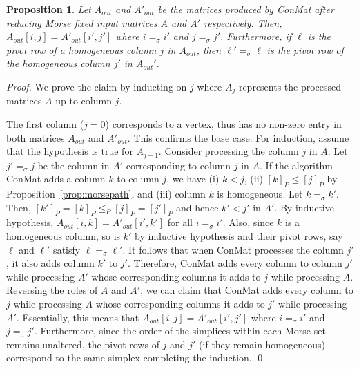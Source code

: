 \documentclass[a4paper,english,cleveref]{article}
\theoremstyle{plain}
\newtheorem{prop}{Proposition}[section]
\newcounter{li}
\newcommand{\tamal}[1]{\textcolor{blue}{#1}}
\newcommand\michal[1]{\textcolor{ForestGreen}{[ML: #1]}}
\begin{document}
\begin{prop}
Let $A_{out}$ and $A'_{out}$ be the matrices produced by {\sc ConMat} after
reducing Morse fixed input matrices $A$ and $A'$ respectively. Then,
  $A_{out}[i,j]=A'_{out}[i',j']$ where $i=_\sigma i'$ and $j=_\sigma j'$. 
  Furthermore, if $\ell$ is the pivot row of a homogeneous column $j$ in $A_{out}$,
  then $\ell'=_\sigma \ell$ is the pivot row of the homogeneous column $j'$ in $A_{out}'$.
\label{prop:morsefixed}
\end{prop}
\begin{proof}
    We prove the claim by inducting on $j$ where $A_j$ represents
    the processed matrices $A$ up to
    column $j$.
    
    The first column ($j=0$) corresponds to a vertex,
    thus has no non-zero entry in both matrices $A_{out}$ and $A'_{out}$.
    This confirms the base case. For induction, assume that the
    hypothesis is true for $A_{j-1}$. Consider processing the column $j$
    in $A$. Let $j'=_\sigma j$ be the column in $A'$ corresponding to column
    $j$ in $A$. If the algorithm {\sc ConMat} adds a column $k$ to
    column $j$, we have (i) $k <j$,  (ii) 
    $[k]_P \leq [j]_P$
    by Proposition~\ref{prop:morsepath}, and (iii) column $k$ is homogeneous. Let $k=_\sigma k'$. Then, 
    $[k']_P=[k]_P\leq_P [j]_P=[j']_P$ 
    and hence $k'< j'$ in $A'$.
    By inductive hypothesis,
    $A_{out}[i,k]= A'_{out}[i',k']$ for all $i=_\sigma i'$.
    Also, since $k$ is a homogeneous column,
    so is $k'$ by inductive hypothesis and their pivot rows, say $\ell$ and $\ell'$
    satisfy $\ell=_\sigma \ell'$. 
    It follows that when {\sc ConMat} processes the column $j'$, it also
    adds column $k'$ to $j'$. Therefore, {\sc ConMat} adds every column 
    to column $j'$ while processing $A'$ whose corresponding columns it adds to $j$ while processing
    $A$. Reversing the roles of $A$ and $A'$, we can claim that {\sc ConMat}
    adds every column to $j$ while processing $A$ whose corresponding columns it adds to $j'$ while
    processing $A'$. Essentially, this means that $A_{out}[i,j]=A'_{out}[i',j']$
    where $i=_\sigma i'$ and $j=_\sigma j'$. Furthermore, since the order
    of the simplices within each Morse set remains unaltered, the pivot rows of $j$ and $j'$ (if they remain homogeneous) 
    correspond to the
    same simplex completing the induction. \qed
\end{proof}
\end{document}
